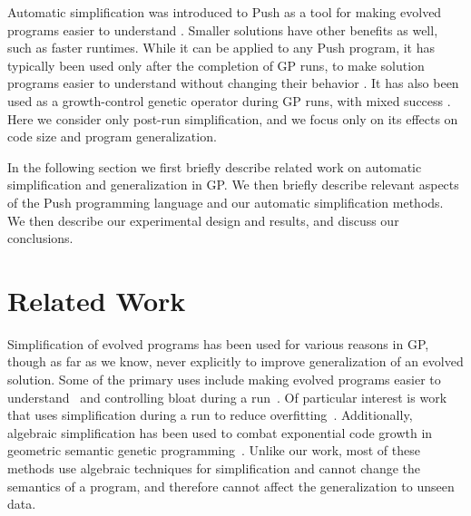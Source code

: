 Automatic simplification was introduced to Push as a tool for making evolved programs easier to understand \cite{Robinson:2001:GPtieus, spector:2002:GPEM}. Smaller solutions have other benefits as well, such as faster runtimes. While it can be applied to any Push program, it has typically been used only after the completion of GP runs, to make solution programs easier to understand without changing their behavior \cite{Spector:2014:GECCOcomp}. It has also been used as a growth-control genetic operator during GP runs, with mixed success \cite{Zhan:2014:GECCOcomp}. Here we consider only post-run simplification, and we focus only on its effects on code size and program generalization.

In the following section we first briefly describe related work on automatic simplification and generalization in GP. We then briefly describe relevant aspects of the Push programming language and our automatic simplification methods. We then describe our experimental design and results, and discuss our conclusions.


\section{Related Work}
\label{sec:related}


Simplification of evolved programs has been used for various reasons in GP, though as far as we know, never explicitly to improve generalization of an evolved solution. Some of the primary uses include making evolved programs easier to understand~\cite{koza:book} and controlling bloat during a run~\cite{1144156, Kinzett:2010:cec, Brameier:2001:TEC, ekart:1999:EA}. %
Of particular interest is work that uses simplification during a run to reduce overfitting~\cite{Kinzett:2010:cec, hooper:1996:iarGPes}. Additionally, algebraic simplification has been used to combat exponential code growth in geometric semantic genetic programming~\cite{conf/ppsn/MoraglioKJ12}. Unlike our work, most of these methods use algebraic techniques for simplification and cannot change the semantics of a program, and therefore cannot affect the generalization to unseen data.

